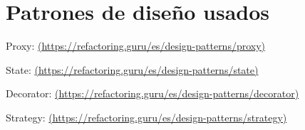 \documentclass[11pt,a4paper]{article}
\begin{document}
\begin{figure}[H]
\end{figure}

\begin{figure}[H]
\end{figure}

\section{Patrones de diseño usados}

Proxy: \url{(https://refactoring.guru/es/design-patterns/proxy)}

State: \url{(https://refactoring.guru/es/design-patterns/state)}

Decorator: \url{(https://refactoring.guru/es/design-patterns/decorator)}

Strategy: \url{(https://refactoring.guru/es/design-patterns/strategy)}
\end{document}
